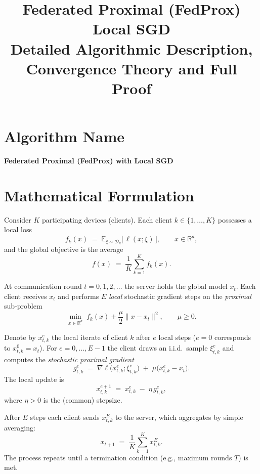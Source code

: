 \documentclass[11pt]{article}
\newcommand{\E}{\mathbb{E}}
\newcommand{\R}{\mathbb{R}}
\begin{document}
\title{Federated Proximal (FedProx) Local SGD \\ Detailed Algorithmic Description, Convergence Theory and Full Proof}
\author{}
\date{}
\maketitle

\tableofcontents
\newpage

\section*{Algorithm Name}
\begin{center}
\textbf{Federated Proximal (FedProx) with Local SGD}
\end{center}

\section*{Mathematical Formulation}
Consider $K$ participating devices (clients).  
Each client $k\in\{1,\dots,K\}$ possesses a local loss
\[
f_k(x)\;=\;\E_{\xi\sim\mathcal{D}_k}\bigl[\,\ell(x;\xi)\,\bigr],\qquad 
x\in\R^{d},
\]
and the global objective is the average
\[
f(x)\;=\;\frac1K\sum_{k=1}^{K}f_k(x).
\]

At communication round $t=0,1,2,\dots$ the server holds the global model $x_t$.
Each client receives $x_t$ and performs $E$ \emph{local} stochastic gradient steps on the
\emph{proximal} sub‑problem
\[
\min_{x\in\R^{d}} \; f_k(x)+\frac{\mu}{2}\|x-x_t\|^{2},
\qquad \mu\ge 0.
\]

Denote by $x_{t,k}^{e}$ the local iterate of client $k$ after $e$ local steps
($e=0$ corresponds to $x_{t,k}^{0}=x_t$).  
For $e=0,\dots,E-1$ the client draws an i.i.d.\ sample $\xi_{t,k}^{e}$ and computes the
\emph{stochastic proximal gradient}
\[
g_{t,k}^{e}\;=\;\nabla\ell\bigl(x_{t,k}^{e};\xi_{t,k}^{e}\bigr)
               \;+\;\mu\bigl(x_{t,k}^{e}-x_t\bigr).
\]
The local update is
\begin{equation}
\label{eq:local-update}
x_{t,k}^{e+1}\;=\;x_{t,k}^{e}\;-\;\eta\,g_{t,k}^{e},
\end{equation}
where $\eta>0$ is the (common) stepsize.

After $E$ steps each client sends $x_{t,k}^{E}$ to the server, which aggregates by simple averaging:
\begin{equation}
\label{eq:global-avg}
x_{t+1}\;=\;\frac1K\sum_{k=1}^{K}x_{t,k}^{E}.
\end{equation}
The process repeats until a termination condition (e.g., maximum rounds $T$) is met.
\end{document}
